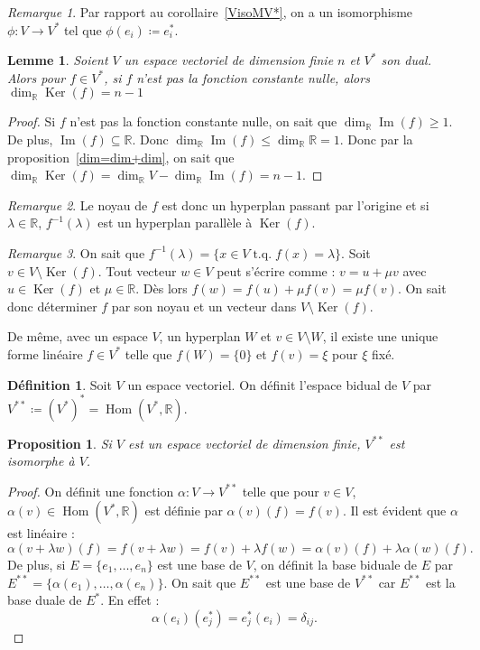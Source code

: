 \documentclass{article}
\DeclareMathOperator{\tq}{\text{ t.q. }}
\DeclareMathOperator{\Ker}{Ker}
\DeclareMathOperator{\Imf}{Im}
\DeclareMathOperator{\Hom}{Hom}
\newcommand{\R}{\mathbb R}
\newtheorem{prp}[thm]{Proposition}
\newtheorem{lem}[thm]{Lemme}
\theoremstyle{definition}
\newtheorem{déf}[thm]{Définition}
\theoremstyle{remark}
\newtheorem*{rmq}{Remarque}
\begin{document}
		\begin{rmq} Par rapport au corollaire~\ref{VisoMV*}, on a un isomorphisme $\phi : V \to V^*$ tel que $\phi(e_i) \coloneqq e_i^*$. \end{rmq}

		\begin{lem} Soient $V$ un espace vectoriel de dimension finie $n$ et $V^*$ son dual. Alors pour $f \in V^*$, si $f$ n'est pas la fonction constante nulle,
		alors $\dim_\R \Ker(f) = n-1$ \end{lem}

		\begin{proof} Si $f$ n'est pas la fonction constante nulle, on sait que $\dim_\R \Imf(f) \geq 1$. De plus, $\Imf(f) \subseteq \R$. Donc
		$\dim_\R\Imf(f) \leq \dim_\R \R = 1$. Donc par la proposition~\ref{dim=dim+dim}, on sait que $\dim_\R\Ker(f) = \dim_\R V - \dim_\R\Imf(f) = n-1$. \end{proof}

		\begin{rmq} Le noyau de $f$ est donc un hyperplan passant par l'origine et si $\lambda \in \R$, $f^{-1}(\lambda)$ est un hyperplan parallèle à $\Ker(f)$. \end{rmq}

		\begin{rmq} On sait que $f^{-1}(\lambda) = \{x \in V \tq f(x) = \lambda\}$. Soit $v \in V \setminus \Ker(f)$. Tout vecteur $w \in V$ peut s'écrire comme :
		$v = u + \mu v$ avec $u \in \Ker(f)$ et $\mu \in \R$. Dès lors $f(w) = f(u) + \mu f(v) = \mu f(v)$. On sait donc déterminer $f$ par son noyau et un vecteur dans
		$V \setminus \Ker(f)$. 
		
		De même, avec un espace $V$, un hyperplan $W$ et $v \in V \setminus W$, il existe une unique forme linéaire $f \in V^*$ telle que $f(W) = \{0\}$ et $f(v) = \xi$
		pour $\xi$ fixé. \end{rmq}

		\begin{déf} Soit $V$ un espace vectoriel. On définit l'espace bidual de $V$ par $V^{**} \coloneqq (V^*)^* = \Hom(V^*, \R)$. \end{déf}
		
		\begin{prp} Si $V$ est un espace vectoriel de dimension finie, $V^{**}$ est isomorphe à $V$. \end{prp}
		
		\begin{proof} On définit une fonction $\alpha : V \to V^{**}$ telle que pour $v \in V$, $\alpha(v) \in \Hom(V^*, \R)$ est définie par $\alpha(v)(f) = f(v)$.
		Il est évident que $\alpha$ est linéaire : \[\alpha(v+\lambda w)(f) = f(v+\lambda w) = f(v)+\lambda f(w) = \alpha(v)(f) + \lambda\alpha(w)(f).\]
		De plus, si $E = \{e_1, \ldots, e_n\}$ est une base de $V$, on définit la base biduale de $E$ par $E^{**} = \{\alpha(e_1), \ldots, \alpha(e_n)\}$. On sait que $E^{**}$
		est une base de $V^{**}$ car $E^{**}$ est la base duale de $E^*$. En effet : \[\alpha(e_i)(e_j^*) = e_j^*(e_i) = \delta_{ij}.\] \end{proof}
\end{document}
